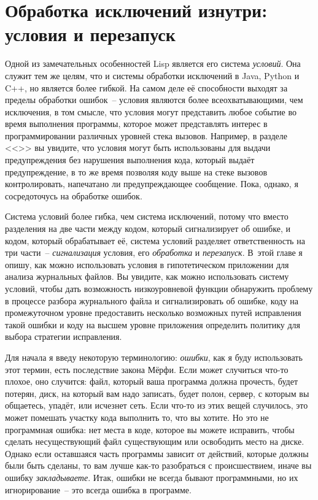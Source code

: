 \chapter{Обработка исключений изнутри: условия и перезапуск}
\label{ch:19}

\thispagestyle{empty}

Одной из замечательных особенностей Lisp является его система \textit{условий}. Она служит
тем же целям, что и системы обработки исключений в Java, Python и C++, но является более
гибкой. На самом деле её способности выходят за пределы обработки ошибок~-- условия
являются более всеохватывающими, чем исключения, в том смысле, что условия могут
представить любое событие во время выполнения программы, которое может представлять
интерес в программировании различных уровней стека вызовов. Например, в разделе
<<>> вы увидите, что условия могут быть использованы для выдачи
предупреждения без нарушения выполнения кода, который выдаёт предупреждение, в то же время
позволяя коду выше на стеке вызовов контролировать, напечатано ли предупреждающее
сообщение. Пока, однако, я сосредоточусь на обработке ошибок.

Система условий более гибка, чем система исключений, потому что вместо разделения на две
части между кодом, который сигнализирует об ошибке, и кодом, который обрабатывает
её, система условий разделяет
ответственность на три части~-- \textit{сигнализация} условия, его \textit{обработка} и
\textit{перезапуск}. В~этой главе я опишу, как можно использовать условия в гипотетическом
приложении для анализа журнальных файлов. Вы увидите, как можно использовать систему
условий, чтобы дать возможность низкоуровневой функции обнаружить проблему в процессе
разбора журнального файла и сигнализировать об ошибке, коду на промежуточном уровне
предоставить несколько возможных путей исправления такой ошибки и коду на высшем уровне
приложения определить политику для выбора стратегии исправления.

Для начала я введу некоторую терминологию: \textit{ошибки}, как я буду использовать этот
термин, есть последствие закона Мёрфи. Если может случиться что-то плохое, оно случится:
файл, который ваша программа должна прочесть, будет потерян, диск, на который вам надо
записать, будет полон, сервер, с которым вы общаетесь, упадёт, или исчезнет сеть. Если
что-то из этих вещей случилось, это может помешать участку кода выполнить то, что вы
хотите. Но это не программная ошибка: нет места в коде, которое вы можете исправить, чтобы
сделать несуществующий файл существующим или освободить место на диске. Однако если
оставшаяся часть программы зависит от действий, которые должны были быть сделаны, то вам
лучше как-то разобраться с происшествием, иначе вы ошибку \textit{закладываете}. Итак,
ошибки не всегда бывают программными, но их игнорирование~-- это всегда ошибка в
программе.

